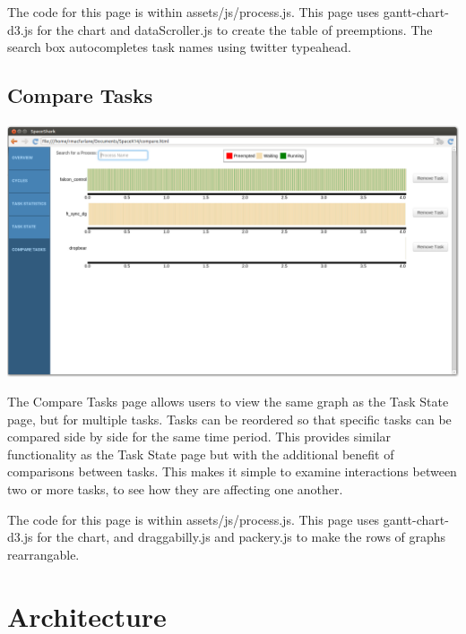 \documentclass{hmcclinic}
\begin{document}
    The code for this page is within assets/js/process.js. This page uses
    gantt-chart-d3.js for the chart and dataScroller.js to create the table of
    preemptions. The search box autocompletes task names using twitter
    typeahead.
  
  \subsection{Compare Tasks} %

  \includegraphics[scale=0.25]{compare-page.png}
 
The Compare Tasks page allows users to view the same graph as the Task State
page, but for multiple tasks. Tasks can be reordered so that specific tasks can
be compared side by side for the same time period. This provides similar
functionality as the Task State page but with the additional benefit of
comparisons between tasks. This makes it simple to examine interactions between two or more tasks, to see how they are affecting one another.

The code for this page is within assets/js/process.js. This page uses
    gantt-chart-d3.js for the chart, and draggabilly.js and packery.js to make the rows of graphs rearrangable.

\section{Architecture} %
\end{document}
